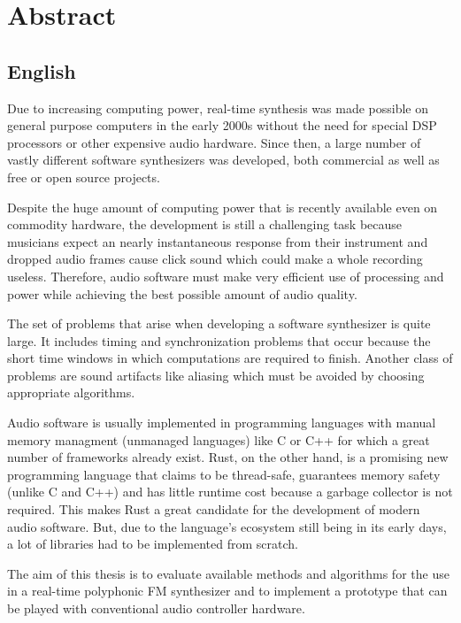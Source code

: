 \chapter*{Abstract}\label{abstract}


\section*{English}

Due to increasing computing power, real-time synthesis was made possible on general purpose computers in the early 2000s without the need for special DSP processors or other expensive audio hardware.
Since then, a large number of vastly different software synthesizers was developed, both commercial as well as free or open source projects.

Despite the huge amount of computing power that is recently available even on commodity hardware, the development is still a challenging task because musicians expect an nearly instantaneous response from their instrument and dropped audio frames cause click sound which could make a whole recording useless.
Therefore, audio software must make very efficient use of processing and power while achieving the best possible amount of audio quality.

The set of problems that arise when developing a software synthesizer is quite large.
It includes timing and synchronization problems that occur because the short time windows in which computations are required to finish.
Another class of problems are sound artifacts like aliasing which must be avoided by choosing appropriate algorithms.

Audio software is usually implemented in programming languages with manual memory managment (unmanaged languages) like C or C++ for which a great number of frameworks already exist.
Rust, on the other hand, is a promising new programming language that claims to be thread-safe, guarantees memory safety (unlike C and C++) and has little runtime cost because a garbage collector is not required.
This makes Rust a great candidate for the development of modern audio software.
But, due to the language's ecosystem still being in its early days, a lot of libraries had to be implemented from scratch.

The aim of this thesis is to evaluate available methods and algorithms for the use in a real-time polyphonic FM synthesizer and to implement a prototype that can be played with conventional audio controller hardware.

